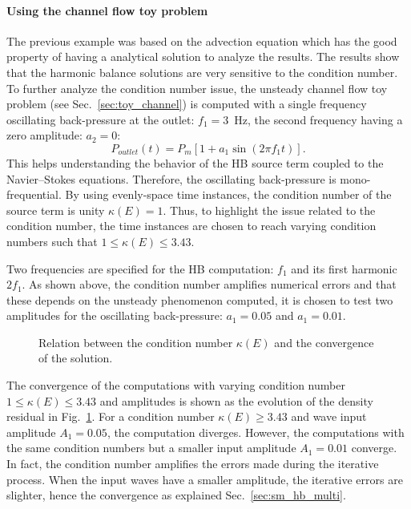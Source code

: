 \paragraph{Using the channel flow toy problem}
The previous example was based on the advection equation which
has the good property of having a analytical solution to 
analyze the results. The results show that the harmonic
balance solutions are very sensitive to the condition number.
To further analyze the condition number issue,
the unsteady channel flow toy problem
(see Sec.~\ref{sec:toy_channel}) is computed with a single
frequency oscillating back-pressure 
at the outlet: $f_1 = 3$~Hz, the second
frequency having a zero amplitude: $a_2= 0$:
\begin{equation}
   P_{outlet} (t) = P_m \left[ 1 + a_1 \sin \left(2 \pi f_1 t\right) \right].
\end{equation}
This helps understanding the behavior of the HB source term
coupled to the Navier--Stokes equations.
Therefore, the oscillating back-pressure is mono-frequential.
By using evenly-space time instances, the condition
number of the source term is unity $\kappa (E) = 1$. 
Thus, to highlight the issue related to the condition number,
the time instances are chosen to reach varying condition numbers
such that $1 \leq \kappa (E) \leq 3.43$.  

Two frequencies are
specified for the HB computation: $f_1$ and its first harmonic
$2f_1$.
As shown above, the condition number amplifies numerical errors and that these
depends on the unsteady phenomenon computed, it is chosen to
test two amplitudes for the oscillating back-pressure: $a_1 = 0.05$
and $a_1=0.01$.

\begin{figure}[htb]
  \centering 
  \caption{Relation between the condition number $\kappa (E)$ and the
    convergence of the solution.}
  \label{fig:canal_residual_vs_conditionning}
\end{figure}
The convergence of the computations with varying condition number 
$1 \leq \kappa (E) \leq 3.43$ and
amplitudes is shown as the evolution of the density residual in 
Fig.~\ref{fig:canal_residual_vs_conditionning}.
For a condition number $\kappa (E) \geq 3.43$ and wave input amplitude
$A_1 = 0.05$, the computation diverges. However, the computations with
the same condition numbers but a smaller input amplitude $A_1 = 0.01$
converge. In fact, the condition number amplifies the errors made
during the iterative process. When the input waves have a smaller
amplitude, the iterative errors are slighter, hence the convergence as
explained Sec.~\ref{sec:sm_hb_multi}.

